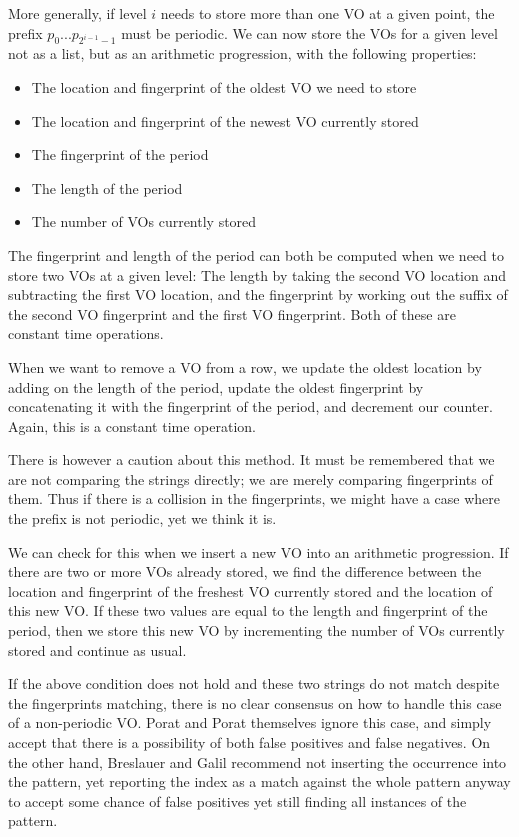 \documentclass[ %
                    author={Dominic Joseph Moylett},
                    degree={MEng},
                     title={Dictionary Matching with Fingerprints},
                  subtitle={An Empirical Analysis},
                      type={research},
                      year={2015} ]{dissertation}
\begin{document}
More generally, if level $i$ needs to store more than one VO at a given point, the prefix $p_0...p_{2^{i-1} - 1}$ must be periodic. We can now store the VOs for a given level not as a list, but as an arithmetic progression, with the following properties:

\begin{itemize}
  \item The location and fingerprint of the oldest VO we need to store
  \item The location and fingerprint of the newest VO currently stored
  \item The fingerprint of the period
  \item The length of the period
  \item The number of VOs currently stored
\end{itemize}

The fingerprint and length of the period can both be computed when we need to store two VOs at a given level: The length by taking the second VO location and subtracting the first VO location, and the fingerprint by working out the suffix of the second VO fingerprint and the first VO fingerprint. Both of these are constant time operations.

When we want to remove a VO from a row, we update the oldest location by adding on the length of the period, update the oldest fingerprint by concatenating it with the fingerprint of the period, and decrement our counter. Again, this is a constant time operation.

There is however a caution about this method. It must be remembered that we are not comparing the strings directly; we are merely comparing fingerprints of them. Thus if there is a collision in the fingerprints, we might have a case where the prefix is not periodic, yet we think it is.

We can check for this when we insert a new VO into an arithmetic progression. If there are two or more VOs already stored, we find the difference between the location and fingerprint of the freshest VO currently stored and the location of this new VO. If these two values are equal to the length and fingerprint of the period, then we store this new VO by incrementing the number of VOs currently stored and continue as usual.

If the above condition does not hold and these two strings do not match despite the fingerprints matching, there is no clear consensus on how to handle this case of a non-periodic VO. Porat and Porat themselves ignore this case, and simply accept that there is a possibility of both false positives and false negatives. On the other hand, Breslauer and Galil \cite{Breslauer:2014:RSS:2660854.2635814} recommend not inserting the occurrence into the pattern, yet reporting the index as a match against the whole pattern anyway to accept some chance of false positives yet still finding all instances of the pattern.
\end{document}
